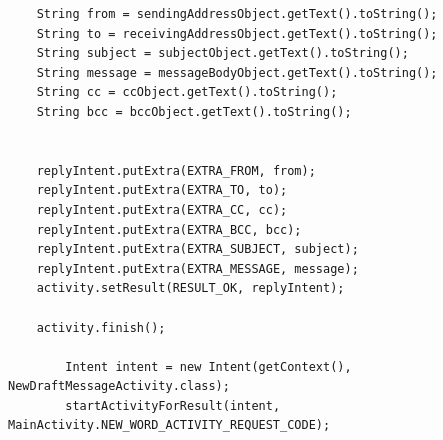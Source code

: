 \documentclass[a4paper,11pt]{article}
\begin{document}
\begin{appendices}
\begin{lstlisting}
    String from = sendingAddressObject.getText().toString();
    String to = receivingAddressObject.getText().toString();
    String subject = subjectObject.getText().toString();
    String message = messageBodyObject.getText().toString();
    String cc = ccObject.getText().toString();
    String bcc = bccObject.getText().toString();


    replyIntent.putExtra(EXTRA_FROM, from);
    replyIntent.putExtra(EXTRA_TO, to);
    replyIntent.putExtra(EXTRA_CC, cc);
    replyIntent.putExtra(EXTRA_BCC, bcc);
    replyIntent.putExtra(EXTRA_SUBJECT, subject);
    replyIntent.putExtra(EXTRA_MESSAGE, message);
    activity.setResult(RESULT_OK, replyIntent);

    activity.finish();

        Intent intent = new Intent(getContext(), NewDraftMessageActivity.class);
        startActivityForResult(intent, MainActivity.NEW_WORD_ACTIVITY_REQUEST_CODE);

\end{lstlisting}

\end{appendices}
\end{document}
